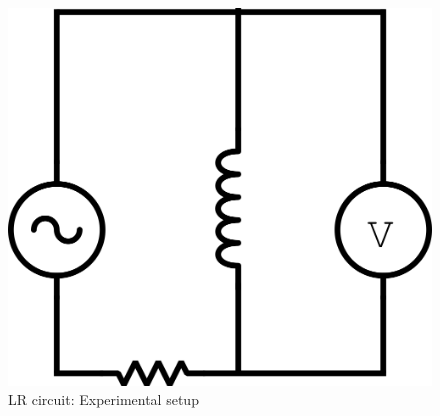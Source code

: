 \documentclass[12pt]{article}
\begin{document}
    \begin{figure}[H]
        \centering
        \includegraphics{LRSetup.png}
        \caption{LR circuit: Experimental setup}
    \end{figure}
\end{document}
